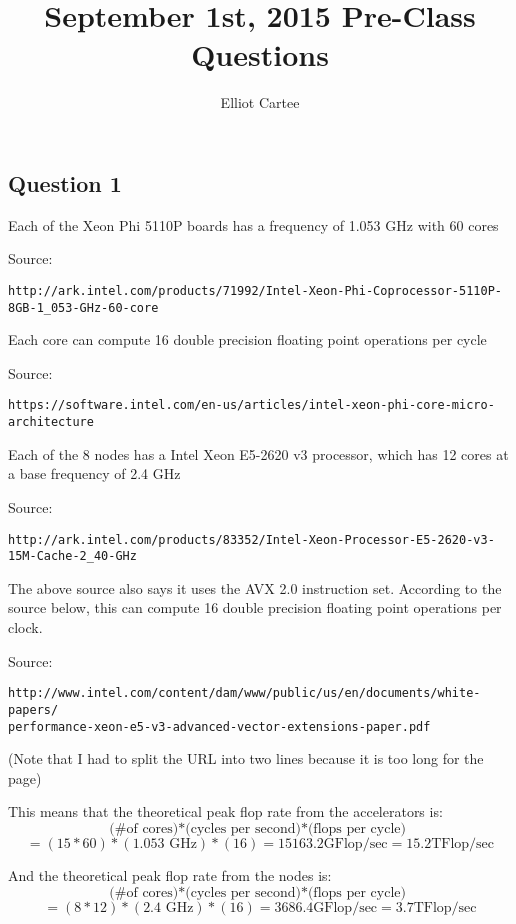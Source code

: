 \documentclass[11pt]{article}
\title{September 1st, 2015 Pre-Class Questions}
\author{Elliot Cartee}
\begin{document}
\maketitle
\subsection*{Question 1}

Each of the Xeon Phi 5110P boards has a frequency of 1.053 GHz with 60 cores

Source: 
\begin{verbatim}
http://ark.intel.com/products/71992/Intel-Xeon-Phi-Coprocessor-5110P-8GB-1_053-GHz-60-core
\end{verbatim}
	
Each core can compute 16 double precision floating point operations per cycle

Source: 
\begin{verbatim}
https://software.intel.com/en-us/articles/intel-xeon-phi-core-micro-architecture
\end{verbatim}
	
Each of the 8 nodes has a Intel Xeon E5-2620 v3 processor, which has 12 cores at a base frequency of 2.4 GHz

Source: 
\begin{verbatim}
http://ark.intel.com/products/83352/Intel-Xeon-Processor-E5-2620-v3-15M-Cache-2_40-GHz
\end{verbatim}

The above source also says it uses the AVX 2.0 instruction set. According to the source below, this can compute 16 double precision floating point operations per clock.

Source: 
\begin{verbatim} 
http://www.intel.com/content/dam/www/public/us/en/documents/white-papers/
performance-xeon-e5-v3-advanced-vector-extensions-paper.pdf 
\end{verbatim}

(Note that I had to split the URL into two lines because it is too long for the page)



This means that the theoretical peak flop rate from the accelerators is:
$$
\mbox{(\# of cores)*(cycles per second)*(flops per cycle) } 
$$
$$
= (15*60)*(1.053 \mbox{ GHz})*(16) = 15163.2 \mbox{GFlop/sec} = 15.2 \mbox{TFlop/sec}
$$

And the theoretical peak flop rate from the nodes is:
$$
\mbox{(\# of cores)*(cycles per second)*(flops per cycle) } 
$$
$$
= (8*12)*(2.4 \mbox{ GHz})*(16) = 3686.4 \mbox{GFlop/sec} = 3.7 \mbox{TFlop/sec}
$$
\end{document}
